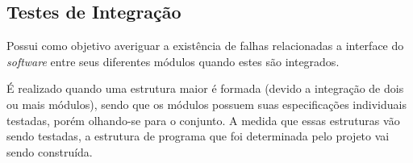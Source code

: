     \subsection{Testes de Integração}
        Possui como objetivo averiguar a existência de falhas relacionadas a interface do \textit{software} entre seus diferentes módulos quando estes são integrados. 
        
        É realizado quando uma estrutura maior é formada (devido a integração de dois ou mais módulos), sendo que os módulos possuem suas especificações individuais testadas, porém olhando-se para o conjunto.  A medida que essas estruturas vão sendo testadas, a estrutura de programa que foi determinada pelo projeto vai sendo construída. 
